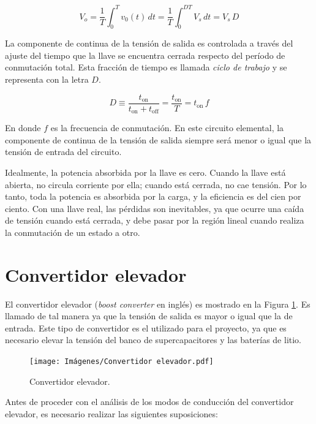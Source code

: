 \begin{equation}   
    V_o = \frac{1}{T} \int_{0}^{T} v_0(t) \,dt = \frac{1}{T} \int_{0}^{DT} V_s \,dt = V_s \, D
\end{equation}

La componente de continua de la tensión de salida es controlada a través del ajuste del tiempo que la llave se encuentra cerrada respecto del período de conmutación total. Esta fracción de tiempo es llamada \emph{ciclo de trabajo} y se representa con la letra $D$.

\begin{equation}
    D \equiv \frac{t_{\mathrm{on}}}{t_{\mathrm{on}} + t_{\mathrm{off}}} = \frac{t_{\mathrm{on}}}{T} = t_{\mathrm{on}} \, f
\end{equation}

En donde $f$ es la frecuencia de conmutación. En este circuito elemental, la componente de continua de la tensión de salida siempre será menor o igual que la tensión de entrada del circuito.

Idealmente, la potencia absorbida por la llave es cero. Cuando la llave está abierta, no circula corriente por ella; cuando está cerrada, no cae tensión. Por lo tanto, toda la potencia es absorbida por la carga, y la eficiencia es del cien por ciento. Con una llave real, las pérdidas son inevitables, ya que ocurre una caída de tensión cuando está cerrada, y debe pasar por la región lineal cuando realiza la conmutación de un estado a otro.

\section{Convertidor elevador}

El convertidor elevador (\emph{boost converter} en inglés) es mostrado en la Figura \ref{convertidor-elevador}. Es llamado de tal manera ya que la tensión de salida es mayor o igual que la de entrada. Este tipo de convertidor es el utilizado para el proyecto, ya que es necesario elevar la tensión del banco de supercapacitores y las baterías de litio.

\begin{figure}[hbt!]
    \centering
    \texttt{[image: Imágenes/Convertidor elevador.pdf]}
    \caption{Convertidor elevador.}
    \label{convertidor-elevador}
\end{figure}

Antes de proceder con el análisis de los modos de conducción del convertidor elevador, es necesario realizar las siguientes suposiciones:

